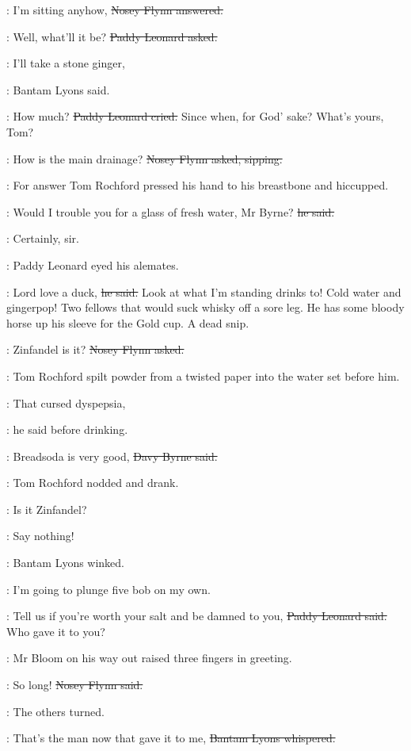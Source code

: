 \nosey:
I'm sitting anyhow,
\sout{Nosey Flynn answered.}

\leonard:
Well, what'll it be?
\sout{Paddy Leonard asked.}

\bantam:
I'll take a stone ginger,

:
Bantam Lyons said.

\leonard:
How much?
\sout{Paddy Leonard cried.}
Since when, for God' sake?
What's yours, Tom?

\nosey:
How is the main drainage?
\sout{Nosey Flynn asked, sipping.}

:
For answer Tom Rochford pressed his hand to his breastbone and hiccupped.

\rochford:
Would I trouble you for a glass of fresh water, Mr Byrne?
\sout{he said.}

\davybyrne:
Certainly, sir.

:
Paddy Leonard eyed his alemates.

\leonard:
Lord love a duck,
\sout{he said.}
Look at what I'm standing drinks to!
Cold water and gingerpop!
Two fellows that would suck whisky off a sore leg.
He has some bloody horse up his sleeve for the Gold cup.
A dead snip.

\nosey:
Zinfandel is it?
\sout{Nosey Flynn asked.}

:
Tom Rochford spilt powder from a twisted paper
into the water set before him.

\rochford:
That cursed dyspepsia,

:
he said before drinking.

\davybyrne:
Breadsoda is very good,
\sout{Davy Byrne said.}

:
Tom Rochford nodded and drank.

\nosey:
Is it Zinfandel?

\bantam:
Say nothing!

:
Bantam Lyons winked.

\bantam:
I'm going to plunge five bob on my own.

\leonard:
Tell us if you're worth your salt and be damned to you,
\sout{Paddy Leonard said.}
Who gave it to you?

:
Mr Bloom on his way out raised three fingers in greeting.

\nosey:
So long!
\sout{Nosey Flynn said.}

:
The others turned.

\bantam:
That's the man now that gave it to me,
\sout{Bantam Lyons whispered.}

